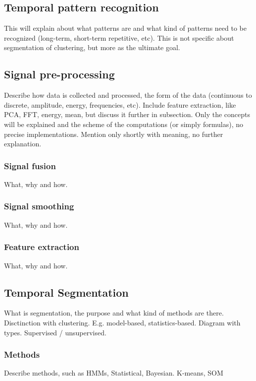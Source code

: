 \documentclass[a4paper,10pt]{extarticle}
\begin{document}
  \subsection{Temporal pattern recognition}
  This will explain about what patterns are and what kind of patterns need to be recognized (long-term, short-term repetitive, etc).
  This is not specific about segmentation of clustering, but more as the ultimate goal.

	\subsection{Signal pre-processing}
  Describe how data is collected and processed, the form of the data (continuous to discrete, amplitude, energy, frequencies, etc).
  Include feature extraction, like PCA, FFT, energy, mean, but discuss it further in subsection.
  Only the concepts will be explained and the scheme of the computations (or simply formulas), no precise implementations.
  Mention only shortly with meaning, no further explanation.

    \subsubsection{Signal fusion}
    What, why and how.

    \subsubsection{Signal smoothing}
    What, why and how.

    \subsubsection{Feature extraction}
    What, why and how.

	\subsection{Temporal Segmentation}
  What is segmentation, the purpose and what kind of methods are there.
  Disctinction with clustering.
  E.g. model-based, statistics-based.
  Diagram with types.
  Supervised / unsupervised.

    \subsubsection{Methods}
    Describe methods, such as HMMs, Statistical, Bayesian. K-means, SOM
\end{document}
